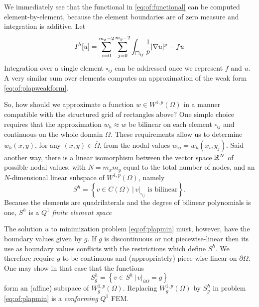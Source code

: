 We immediately see that the functional in \eqref{eq:of:functional} can be computed element-by-element, because the element boundaries are of zero measure and integration is additive.  Let
\begin{equation}
I^h[u] = \sum_{i=0}^{m_x-2} \sum_{j=0}^{m_y-2} \int_{\square_{ij}} \frac{1}{p} |\nabla u|^p - fu  \label{eq:of:sumoverelements}
\end{equation}
Integration over a single element $\square_{ij}$ can be addressed once we represent $f$ and $u$.  A very similar sum over elements computes an approximation of the weak form \eqref{eq:of:plapweakform}.

So, how should we approximate a function $w \in W^{1,p}(\Omega)$ in a manner compatible with the structured grid of rectangles above?  One simple choice requires that the approximation $w_h \approx w$ be bilinear on each element $\square_{ij}$ and continuous on the whole domain $\Omega$.  These requirements allow us to determine $w_h(x,y)$, for any $(x,y)\in \overline\Omega$, from the nodal values $w_{ij} = w_h(x_i,y_j)$.  Said another way, there is a linear isomorphism between the vector space $\mathbb{R}^N$ of possible nodal values, with $N=m_x m_y$ equal to the total number of nodes, and an $N$-dimensional linear subspace of $W^{1,p}(\Omega)$, namely
\begin{equation}
S^h = \left\{v \in C(\Omega) \, \Big| \, v|_{\square_{ij}} \text{ is bilinear}\right\}. \label{eq:of:Shdefn}
\end{equation}
Because the elements are quadrilaterals and the degree of bilinear polynomials is one, $S^h$ is a $Q^1$ \emph{finite element space} \citep{Elmanetal2005}

The solution $u$ to minimization problem \eqref{eq:of:plapmin} must, however, have the boundary values given by $g$.  If $g$ is discontinuous or not piecewise-linear then its use as boundary values conflicts with the restrictions which define $S^h$.  We therefore require $g$ to be continuous and (appropriately) piece-wise linear on $\partial\Omega$.  One may show in that case that the functions
\begin{equation}
S_g^h = \left\{v \in S^h \, \Big| \, v|_{\partial \Omega} = g\right\} \label{eq:of:Sghdefn}
\end{equation}
form an (affine) subspace of $W_g^{1,p}(\Omega)$.  Replacing $W_g^{1,p}(\Omega)$ by $S_g^h$ in problem \eqref{eq:of:plapmin} is a \emph{conforming} $Q^1$ FEM.

